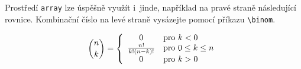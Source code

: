 \documentclass[11pt, twocolumn, a4paper]{article}
\begin{document}
Prostředí \verb|array| lze úspěšně využít i~jinde, například na pravé straně následující rovnice.
Kombinační číslo na levé straně vysázejte pomocí příkazu \verb|\binom|.

$$
\binom{n}{k} =
\left\{
\begin{array}{c l}
	0                   & \text{pro } k < 0           \\
	\frac{n!}{k!(n-k)!} & \text{pro } 0 \leq k \leq n \\
	0                   & \text{pro } k > 0           
\end{array}
\right.
$$
\end{document}
